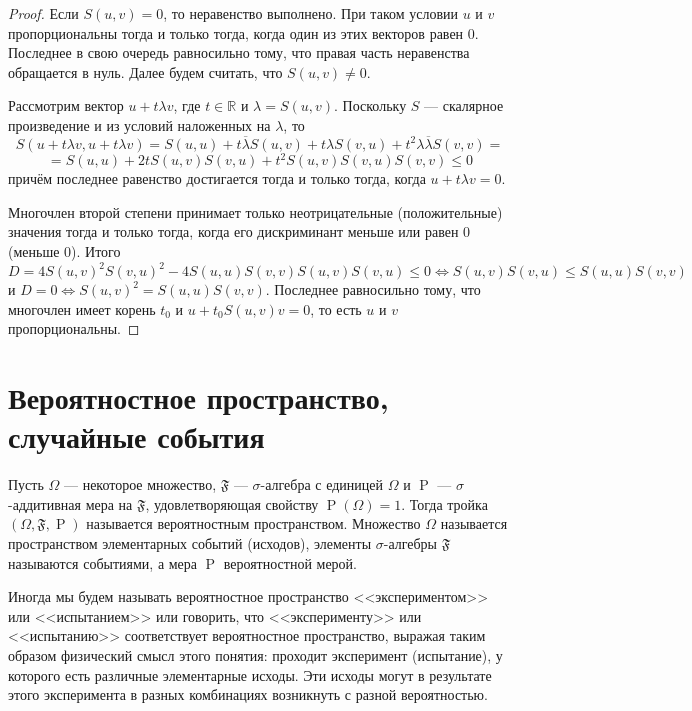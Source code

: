 \documentclass[12pt]{article}
\numberwithin{theorem}{section}
\theoremstyle{definition}
\newcommand{\defin}[2]{\hypertarget{#2}{{\color{red} #1}}}
\newcommand{\RR}{\mathbb{R}}
\newcommand{\prob}{\operatorname{P}}
\begin{document}
	\begin{proof}
		Если $ S(u, v) = 0 $, то неравенство выполнено. При таком условии $ u $ и $ v $ пропорциональны тогда и только тогда,
		когда один из этих векторов равен 0. Последнее в свою очередь равносильно тому, что правая часть неравенства обращается в нуль. Далее будем считать, что $ S(u,v) \neq 0 $.
		
		Рассмотрим вектор $ u + t\lambda v $, где $ t \in \RR $ и $ \lambda = S(u,v) $.
		Поскольку $ S $ --- скалярное произведение и из условий наложенных на $ 
		\lambda $, то 
		$$ S(u + t\lambda v, u + t\lambda v) 
		= S(u, u) + t\overline{\lambda}S(u, v) + t\lambda S(v, u) + t^2\lambda\overline{\lambda}S(v,v) = $$ 
		$$ = S(u,u) + 2tS(u,v)S(v,u) + t^2S(u,v)S(v,u)S(v,v) \leqslant 0 $$
		причём последнее равенство достигается тогда и только тогда, когда $ u + t\lambda v = 0 $.
		
		Многочлен второй степени принимает только неотрицательные (положительные) значения тогда и только тогда, когда его дискриминант меньше или равен 0 (меньше 0).
		Итого $$ D = 4S(u,v)^2S(v,u)^2 - 4S(u,u)S(v,v)S(u,v)S(v,u) \leqslant 0  \Leftrightarrow S(u,v)S(v,u) \leqslant S(u,u)S(v,v) $$
		и $ D = 0 \Leftrightarrow S(u,v)^2 = S(u,u)S(v,v) $. Последнее равносильно тому, что многочлен имеет корень $ t_0 $
		и $ u + t_0S(u, v)v = 0 $, то есть $ u $ и $ v $ пропорциональны.
	\end{proof}
	
	
	
	\section{Вероятностное пространство, случайные события}
	
	Пусть $ \Omega $ --- некоторое множество, $ \mathfrak{F} $ --- $ \sigma $-алгебра с единицей $ \Omega $
	и $ \prob $ --- $ \sigma $-аддитивная мера на $ \mathfrak{F} $, удовлетворяющая свойству $ \prob(\Omega) = 1 $. 
	Тогда тройка $ (\Omega, \mathfrak{F}, \prob) $ называется \defin{вероятностным пространством}{prob-space}.
	Множество $ \Omega $ называется \defin{пространством элементарных событий (исходов)}{space},
	элементы $ \sigma $-алгебры $ \mathfrak{F} $ называются \defin{событиями}{event},
	а мера $ \prob $ \defin{вероятностной мерой}{probability-measure}.
	
	Иногда мы будем называть вероятностное пространство <<экспериментом>> или <<испытанием>>
	или говорить, что <<эксперименту>> или <<испытанию>> соответствует вероятностное пространство,
	выражая таким образом физический смысл этого понятия: проходит эксперимент (испытание), 
	у которого есть различные элементарные исходы. 
	Эти исходы могут в результате этого эксперимента в разных комбинациях возникнуть с разной вероятностью.
	
\end{document}
